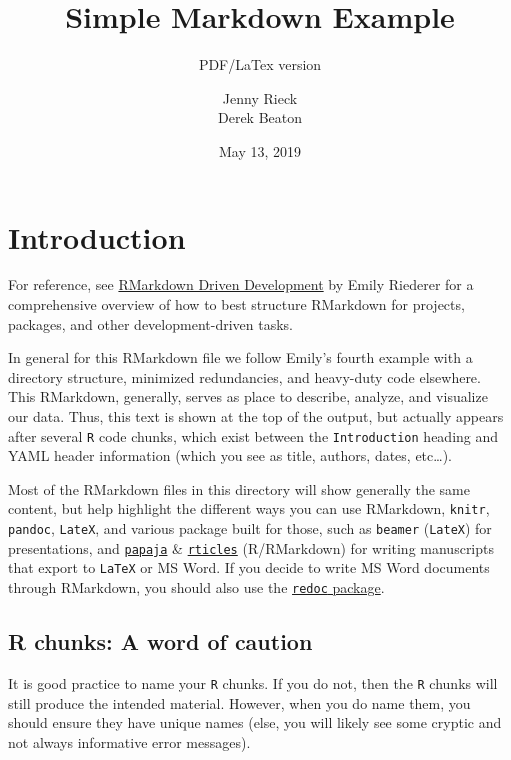 \documentclass[]{article}
\title{Simple Markdown Example}
\subtitle{PDF/LaTex version}
\author{Jenny Rieck \\ Derek Beaton}
\date{May 13, 2019}
\begin{document}
\maketitle

\hypertarget{introduction}{%
\section{Introduction}\label{introduction}}

For reference, see
\href{https://emilyriederer.netlify.com/post/rmarkdown-driven-development/}{RMarkdown
Driven Development} by Emily Riederer for a comprehensive overview of
how to best structure RMarkdown for projects, packages, and other
development-driven tasks.

In general for this RMarkdown file we follow Emily's fourth example with
a directory structure, minimized redundancies, and heavy-duty code
elsewhere. This RMarkdown, generally, serves as place to describe,
analyze, and visualize our data. Thus, this text is shown at the top of
the output, but actually appears after several \texttt{R} code chunks,
which exist between the \texttt{Introduction} heading and YAML header
information (which you see as title, authors, dates, etc\ldots{}).

Most of the RMarkdown files in this directory will show generally the
same content, but help highlight the different ways you can use
RMarkdown, \texttt{knitr}, \texttt{pandoc}, \texttt{LateX}, and various
package built for those, such as \texttt{beamer} (\texttt{LateX}) for
presentations, and
\href{https://github.com/crsh/papaja}{\texttt{papaja}} \&
\href{https://github.com/rstudio/rticles}{\texttt{rticles}}
(R/RMarkdown) for writing manuscripts that export to \texttt{LaTeX} or
MS Word. If you decide to write MS Word documents through RMarkdown, you
should also use the
\href{https://github.com/noamross/redoc}{\texttt{redoc} package}.

\hypertarget{r-chunks-a-word-of-caution}{%
\subsection{R chunks: A word of
caution}\label{r-chunks-a-word-of-caution}}

It is good practice to name your \texttt{R} chunks. If you do not, then
the \texttt{R} chunks will still produce the intended material. However,
when you do name them, you should ensure they have unique names (else,
you will likely see some cryptic and not always informative error
messages).
\end{document}
